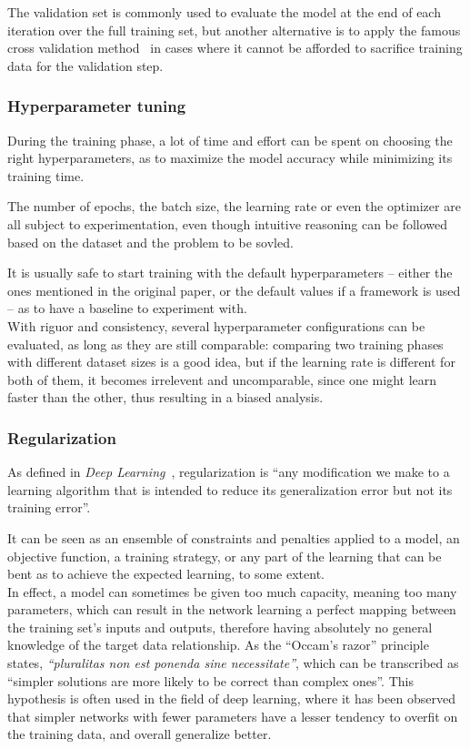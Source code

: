 The validation set is commonly used to evaluate the model at the end of each
iteration over the full training set, but another alternative is to apply the
famous cross validation method~\cite{CrossVal} in cases where it cannot be
afforded to sacrifice training data for the validation step.

	\subsubsection{Hyperparameter tuning}

During the training phase, a lot of time and effort can be spent on choosing
the right hyperparameters, as to maximize the model accuracy while minimizing
its training time.

The number of epochs, the batch size, the learning rate or even the optimizer
are all subject to experimentation, even though intuitive reasoning can be
followed based on the dataset and the problem to be sovled.

It is usually safe to start training with the default hyperparameters -- either
the ones mentioned in the original paper, or the default values if a framework
is used -- as to have a baseline to experiment with.\\

With riguor and consistency, several hyperparameter configurations can be
evaluated, as long as they are still comparable: comparing two training phases
with different dataset sizes is a good idea, but if the learning rate is
different for both of them, it becomes irrelevent and uncomparable, since one
might learn faster than the other, thus resulting in a biased analysis.

	\subsubsection{Regularization}

As defined in \emph{Deep Learning}~\cite{Goodfellow-et-al-2016}, regularization
is ``any modification we make to a learning algorithm that is intended to
reduce its generalization error but not its training error''.

It can be seen as an ensemble of constraints and penalties applied to a model,
an objective function, a training strategy, or any part of the learning that
can be bent as to achieve the expected learning, to some extent.\\

In effect, a model can sometimes be given too much capacity, meaning too many
parameters, which can result in the network learning a perfect mapping between
the training set's inputs and outputs, therefore having absolutely no general
knowledge of the target data relationship. As the ``Occam's razor'' principle
states, \emph{``pluralitas non est ponenda sine necessitate''}, which can be
transcribed as ``simpler solutions are more likely to be correct than complex
ones''. This hypothesis is often used in the field of deep learning, where it
has been observed that simpler networks with fewer parameters have a lesser
tendency to overfit on the training data, and overall generalize better.\\

